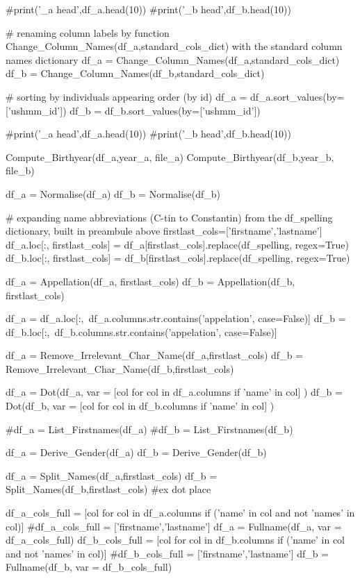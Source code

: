\documentclass[a4paper,12pt,twoside]{book}
\begin{document}
\begin{python}
  #print('\df_a head\n',df_a.head(10))
  #print('\df_b head\n',df_b.head(10))

  # renaming column labels by function Change_Column_Names(df_a,standard_cols_dict) with the standard column names dictionary
  df_a = Change_Column_Names(df_a,standard_cols_dict)
  df_b = Change_Column_Names(df_b,standard_cols_dict)

  # sorting by individuals appearing order (by id)
  df_a = df_a.sort_values(by=['ushmm_id'])
  df_b = df_b.sort_values(by=['ushmm_id'])

  #print('\df_a head\n',df_a.head(10))
  #print('\df_b head\n',df_b.head(10))
  
  Compute_Birthyear(df_a,year_a, file_a)
  Compute_Birthyear(df_b,year_b, file_b)

  df_a = Normalise(df_a)
  df_b = Normalise(df_b)

  # expanding name abbreviations (C-tin to Constantin) from the df_spelling dictionary, built in preambule above
  firstlast_cols=['firstname','lastname']
  df_a.loc[:, firstlast_cols] = df_a[firstlast_cols].replace(df_spelling, regex=True)
  df_b.loc[:, firstlast_cols] = df_b[firstlast_cols].replace(df_spelling, regex=True)

  df_a = Appellation(df_a, firstlast_cols)
  df_b = Appellation(df_b, firstlast_cols)

  df_a = df_a.loc[:,~df_a.columns.str.contains('appelation', case=False)]
  df_b = df_b.loc[:,~df_b.columns.str.contains('appelation', case=False)] 

  df_a = Remove_Irrelevant_Char_Name(df_a,firstlast_cols)
  df_b = Remove_Irrelevant_Char_Name(df_b,firstlast_cols)

  df_a = Dot(df_a, var = [col for col in df_a.columns if 'name' in col] )
  df_b = Dot(df_b, var = [col for col in df_b.columns if 'name' in col] )


  #df_a = List_Firstnames(df_a)
  #df_b = List_Firstnames(df_b)

  df_a = Derive_Gender(df_a)
  df_b = Derive_Gender(df_b)

  df_a = Split_Names(df_a,firstlast_cols)
  df_b = Split_Names(df_b,firstlast_cols)
  #ex dot place
  
  df_a_cols_full = [col for col in df_a.columns if ('name' in col and not 'names' in col)]
  #df_a_cols_full = ['firstname','lastname']
  df_a = Fullname(df_a, var = df_a_cols_full)
  df_b_cols_full = [col for col in df_b.columns if ('name' in col and not 'names' in col)]
  #df_b_cols_full = ['firstname','lastname']
  df_b = Fullname(df_b, var = df_b_cols_full)


\end{python}
\end{document}
